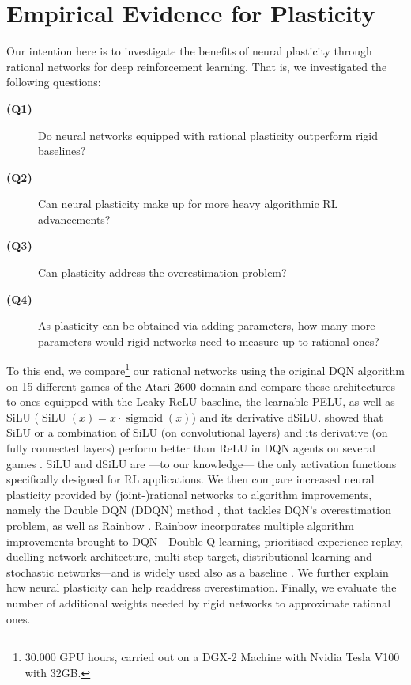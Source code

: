 \documentclass[accepted]{article}
\theoremstyle{plain}
\theoremstyle{definition}
\theoremstyle{remark}
\begin{document}
\section{Empirical Evidence for Plasticity}
\label{sec:Empirical}
Our intention here is to investigate the benefits of neural plasticity through rational networks for deep reinforcement learning. That is, we investigated the following questions: 
\begin{description}
\item[\textbf{(Q1)}] Do neural networks equipped with rational plasticity outperform rigid baselines?
\item[\textbf{(Q2)}] Can neural plasticity make up for more heavy algorithmic RL advancements? 
\item[\textbf{(Q3)}] Can plasticity address the overestimation problem?
\item[\textbf{(Q4)}] As plasticity can be obtained via adding parameters, how many more parameters would rigid networks need to measure up to rational ones? 
\end{description}

To this end, we compare\footnote{$30.000$ GPU hours, carried out on a DGX-2 Machine with Nvidia Tesla V100 with 32GB.} our rational networks using the original DQN algorithm \citep{mnih2015human} on 15 different games of the Atari 2600 domain \citep{Brockman2016OpenAIG} and compare these architectures to ones equipped with the Leaky ReLU baseline, the learnable PELU, as well as SiLU ($\operatorname{SiLU}(x)=x \cdot \operatorname{sigmoid}(x)$) and its derivative dSiLU. \citeauthor{elfwing2018sigmoid} showed that SiLU or a combination of SiLU (on convolutional layers) and its derivative (on fully connected layers) perform better than ReLU in DQN agents on several games . SiLU and dSiLU are ---to our knowledge--- the only activation functions specifically designed for RL applications. We then compare increased neural plasticity provided by (joint-)rational networks to algorithm improvements, namely the Double DQN (DDQN) method \citep{van2016deep}, that tackles DQN's overestimation problem, as well as Rainbow \citep{hessel2018rainbow}. Rainbow incorporates multiple algorithm improvements brought to DQN---Double Q-learning, prioritised experience replay, duelling network architecture, multi-step target, distributional learning and stochastic networks---and is widely used also as a baseline \citep{Lin20space, Hafner21discretewm}. We further explain how neural plasticity can help readdress overestimation. Finally, we evaluate the number of additional weights needed by rigid networks to approximate rational ones.
\end{document}
